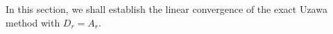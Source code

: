 In this section, we shall establish the linear convergence of the exact Uzawa method with $D_r = A_r$.
\begin{comment} 
\begin{lemma}
The following holds true: for all $Y, Y_k$ in $\Reals{N_x}$, 
\begin{eqnarray}
\|A_r^*(Y) - A_r^*(Y_k) \| &\leq& \frac{1}{r + \lambda_F} \|Y- Y_k\|, \\ 
\|(I - \omega A_r^*) (Y) - (I - \omega A_r^*) (Y_k)   \| &\leq& \left(1 - \frac{\omega}{r + L_F} \right) \|Y -Y_k \|
\end{eqnarray}
\end{lemma}
\begin{proof}
    Note that $A_r^*(Y)$ corresponds to the gradient of the function $F_r^*(Y)$ that is the dual of $F_r(X) = F(X) + \frac{r}{2} \| X\|^2$. 
    $F_r^*$ is $\frac{1}{r +L_F}$-strongly convex and $\frac{1}{r + \lambda_F}$-smooth since $F_r$ is $(r + \lambda)$-strongly convex and $(r + L_F)$-smooth.
    Therefore, we have 
    \begin{equation}
        \|A_r^*(Y) - A_r^*(Y_k) \| \leq \frac{1}{r + \lambda_F} \|Y - Y_k\|. 
    \end{equation}

For $ (I -  \omega A_r^*)(Y)$, we have
 that the 
 \begin{equation}
 \begin{aligned}
    \|  I - \omega \nabla^2F^*_r(Y) \| 
 = \rho ( I - \omega \nabla^2F^*_r(Y)) & \leq \max \left\{|1 - \omega \lambda_{min}(\nabla^2 F_r^*(Y))|, | 1-\omega \lambda_{max} \nabla^2 F_r^*(Y)| \right\} \\
 & \leq \max \left\{  |1 - \frac{\omega}{r + L_F} |, | 1-\frac{\omega}{r + \lambda_F}| \right\}
 \end{aligned}
 \end{equation}
 where $\omega < \frac{2}{ \frac{1}{r + \lambda_F}}$ for any $Y$. 
 For optimal $\omega$ is $\frac{2}{ \frac{\omega}{r + \lambda_F}+ \frac{\omega}{r + L_F}}$, which leads to 
 \begin{equation}
    \| (I - \omega A_r^*)(Y) - (I - \omega A_r^*)(Y) \| \leq  \frac{\kappa - 1}{\kappa + 1} \|Y - Y_k \|,
\end{equation}
where $\kappa = \frac{r+L_F}{r+\lambda_F}$. 

In other analysis where we restrict $\omega \leq \frac{1}{ \frac{1}{r + \lambda_F} }$, we have the following optimal bound
\begin{equation}
    \| (I - \omega A_r^*)(Y) - (I - \omega A_r^*)(Y) \| \leq  \frac{\kappa - 1}{\kappa} \|Y - Y_k \|.
\end{equation}
\end{proof}
\begin{remark}
    This Hessian argument always requires $L$-smoothness of the objective thanks to the mollifier argument. See Lemma \ref{lemmaGD}.
\end{remark}
\end{comment} 

